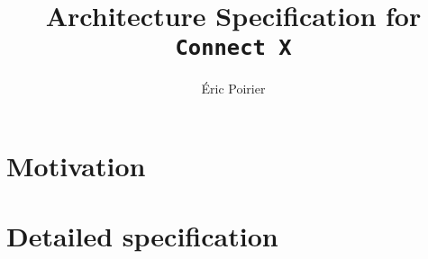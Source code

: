 \documentclass{report}
\newcommand{\files}{./files/}
\begin{document}
\title{Architecture Specification for \texttt{Connect X}}
\author{Éric Poirier}
\maketitle



\chapter{Motivation}



\chapter{Detailed specification}



%
%
\end{document}
